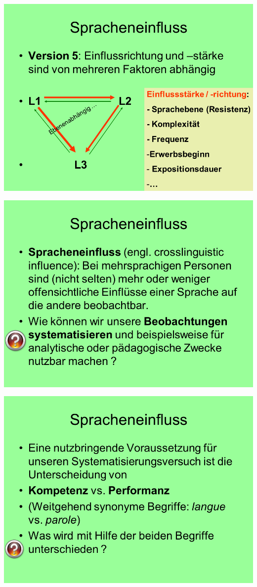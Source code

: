 \documentclass[
  letterpaper,
]{scrbook}
\begin{document}
\includegraphics[width=1\textwidth,height=\textheight]{./pictures/02_Spracheneinfluss_Sprachentrennung/Diapozitiv11.PNG}

\includegraphics[width=1\textwidth,height=\textheight]{./pictures/02_Spracheneinfluss_Sprachentrennung/Diapozitiv12.PNG}

\includegraphics[width=1\textwidth,height=\textheight]{./pictures/02_Spracheneinfluss_Sprachentrennung/Diapozitiv13.PNG}
\end{document}
